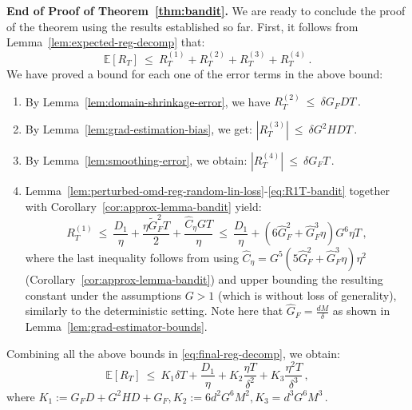 \documentclass[a4paper,11pt,fullpage]{article}
\theoremstyle{plain}
\theoremstyle{definition}
\theoremstyle{plain}
\renewcommand{\leq}{~\le~}
\begin{document}
\noindent\textbf{End of Proof of Theorem~\ref{thm:bandit}.} We are ready to conclude the proof of the theorem using the results established so far. First, it follows from Lemma~\ref{lem:expected-reg-decomp} that: 
\begin{equation}
\label{eq:final-reg-decomp}
\mathbb{E}[R_T] \leq R_T^{(1)} + R_T^{(2)} + R_T^{(3)} + R_T^{(4)}\,.
\end{equation}
We have proved a bound for each one of the error terms in the above bound: 
\begin{enumerate}[label=(\roman*)]
    \item By Lemma~\ref{lem:domain-shrinkage-error}, we have $R_T^{(2)} \leq \delta G_FDT\,.$
    \item By Lemma~\ref{lem:grad-estimation-bias}, we get: $|R_T^{(3)}| \leq \delta G^2 H DT\,.$ 
    \item By Lemma~\ref{lem:smoothing-error}, we obtain: $| R_T^{(4)}| \leq \delta G_FT\,.$
    \item Lemma~\ref{lem:perturbed-omd-reg-random-lin-loss}-\eqref{eq:R1T-bandit} together with Corollary~\ref{cor:approx-lemma-bandit} yield: 
    \begin{equation*}
    R_T^{(1)} \leq \frac{D_1}{\eta} + \frac{\eta \tilde{G}_F^2T}{2} + \frac{\hat{C}_{\eta} G T}{\eta} \leq \frac{D_1}{\eta} + (6 \hat{G}_F^2 + \hat{G}_F^3 \eta) G^6 \eta T\,,
    \end{equation*}
    where the last inequality follows from using $\hat{C}_{\eta} =  G^5 (5\hat{G}_F^2 + \hat{G}_F^3 \eta) \eta^2$ (Corollary~\ref{cor:approx-lemma-bandit}) and upper bounding the resulting constant under the assumptions $G > 1$ (which is without loss of generality), similarly to the deterministic setting. Note here that $\hat{G}_F = \frac{dM}{\delta}$ as shown in Lemma~\ref{lem:grad-estimator-bounds}.   
\end{enumerate}
Combining all the above bounds in \eqref{eq:final-reg-decomp}, we obtain: 
\begin{equation}
\label{eq:regret-upper-bound-proof}
\mathbb{E}[R_T] \leq K_1 \delta T  + \frac{D_1}{\eta} + K_2 \frac{\eta T}{\delta^2} + K_3 \frac{\eta^2 T}{\delta^3}\,, 
\end{equation}
where $K_1 := G_FD + G^2 HD + G_F, K_2 := 6 d^2 G^6 M^2, K_3 = d^3 G^6 M^3\,.$
\end{document}
